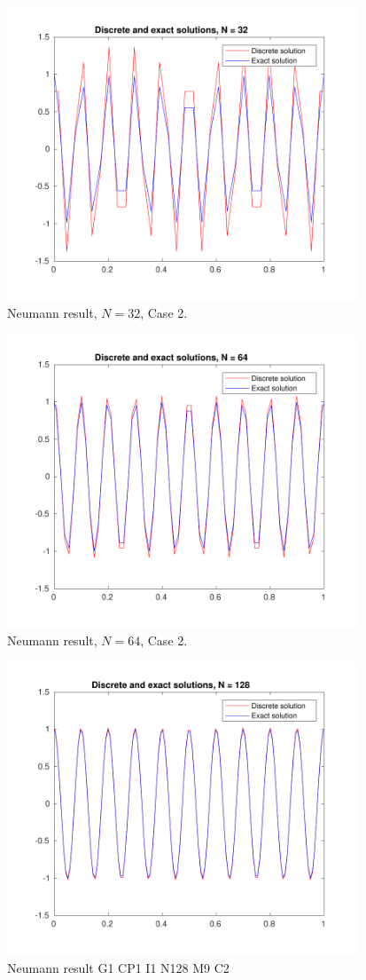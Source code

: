\documentclass[a4paper]{article}
\numberwithin{equation}{section}
\begin{document}
\begin{figure}[H]
\centering\includegraphics[width=10.5cm]{fig_neumann_result_G1_CP1_I1_N32_M6_C2}
\caption{Neumann result, $N=32$, Case 2.}
\end{figure}
\begin{figure}[H]
\centering\includegraphics[width=10.5cm]{fig_neumann_result_G1_CP1_I1_N64_M6_C2}
\caption{Neumann result, $N=64$, Case 2.}
\end{figure}
\begin{figure}[H]
\centering\includegraphics[width=10.5cm]{fig_neumann_result_G1_CP1_I1_N128_M6_C2}
\caption{Neumann result G1 CP1 I1 N128 M9 C2}
\end{figure}
\end{document}
